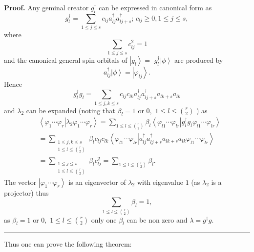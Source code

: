 \documentclass[aps,preprint,amsfonts,amssymb,showpacs,showkeys]{revtex4}%
\newenvironment{proof}[1][Proof]{\noindent\textbf{#1.} }{\ \rule{0.5em}{0.5em}}
\begin{document}
\begin{proof}
Any geminal creator $g_{l}^{\dagger}$ can be expressed in canonical form as
\cite{OrtizWeiner2006,Mazziotti2001}
\begin{equation}
g_{l}^{\dagger}=\sum_{1\leq j\leq s}c_{lj}a_{lj}^{\dagger}a_{lj+s}^{\dagger
};\,c_{lj}\geq0,1\leq j\leq s,
\end{equation}
where
\begin{equation}
\sum_{1\leq j\leq s}c_{lj}^{2}=1
\end{equation}
and the canonical general spin orbitals of $\left\vert g_{l}\right\rangle =$
$g_{l}^{\dagger}\left\vert \phi\right\rangle $ are produced by
\begin{equation}
a_{lj}^{\dagger}\left\vert \phi\right\rangle =\left\vert \varphi
_{lj}\right\rangle .
\end{equation}
Hence
\begin{equation}
g_{l}^{\dagger}g_{l}=\sum_{1\leq j,k\leq s}c_{lj}c_{lk}a_{lj}^{\dagger
}a_{lj+s}^{\dagger}a_{lk+s}a_{lk}%
\end{equation}
and $\lambda_{2}$ can be expanded (noting that $\beta_{l}=1$ or $0,$ $1\leq
l\leq\binom{r}{2}$ ) as
\begin{align}
&  \left\langle \varphi_{1}\cdots\varphi_{r}\left\vert \lambda_{2}\varphi
_{1}\cdots\varphi_{r}\right.  \right\rangle =\sum_{1\leq l\leq\binom{r}{2}%
}\beta_{l}\left\langle \varphi_{l1}\cdots\varphi_{lr}\left\vert g_{l}%
^{\dagger}g_{l}\varphi_{l1}\cdots\varphi_{lr}\right.  \right\rangle \\
&  =\sum_{\substack{1\leq j,k\leq s\\1\leq l\leq\binom{r}{2}}}\beta_{l}%
c_{lj}c_{lk}\left\langle \varphi_{l1}\cdots\varphi_{lr}\left\vert
a_{lj}^{\dagger}a_{lj+s}^{\dagger}a_{lk+s}a_{lk}\varphi_{l1}\cdots\varphi
_{lr}\right.  \right\rangle \\
&  =\sum_{\substack{1\leq j\leq s\\1\leq l\leq\binom{r}{2}}}\beta_{l}%
c_{lj}^{2}=\sum_{1\leq l\leq\binom{r}{2}}\beta_{l}.
\end{align}
The vector $\left\vert \varphi_{1}\cdots\varphi_{r}\right\rangle $ is an
eigenvector of $\lambda_{2}$ with eigenvalue $1$ (as $\lambda_{2}$ is a
projector) thus
\begin{equation}
\sum_{1\leq l\leq\binom{r}{2}}\beta_{l}=1,
\end{equation}
as $\beta_{l}=1$ or $0,$ $1\leq l\leq\binom{r}{2}$ only one $\beta_{l}$ can be
non zero and $\lambda=g^{\dagger}g$.
\end{proof}

Thus one can prove the following theorem:
\end{document}
